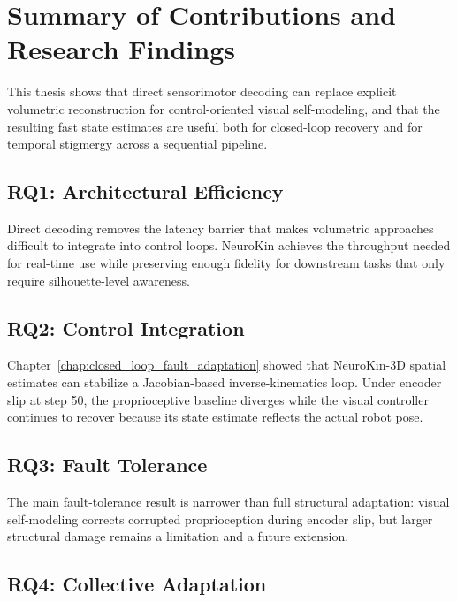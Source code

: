 \documentclass[12pt,a4paper,oneside]{report}
\begin{document}
\section{Summary of Contributions and Research Findings}

This thesis shows that direct sensorimotor decoding can replace explicit volumetric reconstruction for control-oriented visual self-modeling, and that the resulting fast state estimates are useful both for closed-loop recovery and for temporal stigmergy across a sequential pipeline.

\subsection{RQ1: Architectural Efficiency}
\label{subsec:rq1_architectural_efficiency_1}

Direct decoding removes the latency barrier that makes volumetric approaches difficult to integrate into control loops. NeuroKin achieves the throughput needed for real-time use while preserving enough fidelity for downstream tasks that only require silhouette-level awareness.

\subsection{RQ2: Control Integration}
\label{subsec:rq2_control_integration_1}

Chapter~\ref{chap:closed_loop_fault_adaptation} showed that NeuroKin-3D spatial estimates can stabilize a Jacobian-based inverse-kinematics loop. Under encoder slip at step 50, the proprioceptive baseline diverges while the visual controller continues to recover because its state estimate reflects the actual robot pose.

\subsection{RQ3: Fault Tolerance}
\label{subsec:rq3_fault_tolerance_1}

The main fault-tolerance result is narrower than full structural adaptation: visual self-modeling corrects corrupted proprioception during encoder slip, but larger structural damage remains a limitation and a future extension.

\subsection{RQ4: Collective Adaptation}
\label{subsec:rq4_collective_adaptation_1}
\end{document}
